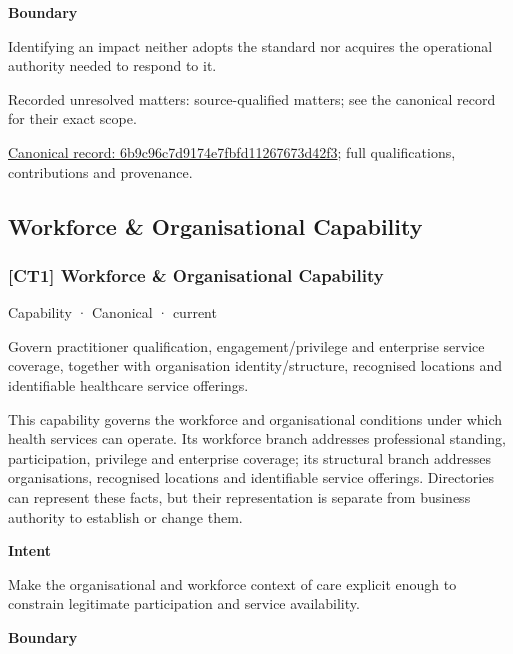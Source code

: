 \textbf{Boundary}



Identifying an impact neither adopts the standard nor acquires the operational authority needed to respond to it.


{\small Recorded unresolved matters: source-qualified matters; see the canonical record for their exact scope.}\par
{\footnotesize \href{../../../../continuum/strategy/capability/6b9c96c7d9174e7fbfd11267673d42f3.md}{Canonical record: 6b9c96c7d9174e7fbfd11267673d42f3}; full qualifications, contributions and provenance.}\par
\subsection{Workforce \& Organisational Capability}

\subsubsection{[CT1] Workforce \& Organisational Capability}

\label{element:631b43664bfb4c50ac8cf4958b2c347d}
{\small Capability · Canonical · current}\par

Govern practitioner qualification, engagement/privilege and enterprise service coverage, together with organisation identity/structure, recognised locations and identifiable healthcare service offerings.



This capability governs the workforce and organisational conditions under which health services can operate. Its workforce branch addresses professional standing, participation, privilege and enterprise coverage; its structural branch addresses organisations, recognised locations and identifiable service offerings. Directories can represent these facts, but their representation is separate from business authority to establish or change them.



\textbf{Intent}



Make the organisational and workforce context of care explicit enough to constrain legitimate participation and service availability.



\textbf{Boundary}



